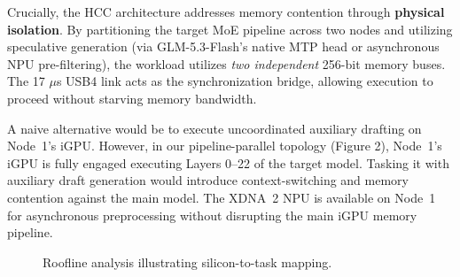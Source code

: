 \documentclass[11pt,a4paper]{article}
\begin{document}
\noindent Crucially, the HCC architecture addresses memory contention through \textbf{physical isolation}. By partitioning the target MoE pipeline across two nodes and utilizing speculative generation (via GLM-5.3-Flash's native MTP head or asynchronous NPU pre-filtering), the workload utilizes \textit{two independent} 256-bit memory buses. The 17 $\mu$s USB4 link acts as the synchronization bridge, allowing execution to proceed without starving memory bandwidth.

A naive alternative would be to execute uncoordinated auxiliary drafting on Node~1's iGPU. However, in our pipeline-parallel topology (Figure 2), Node~1's iGPU is fully engaged executing Layers 0--22 of the target model. Tasking it with auxiliary draft generation would introduce context-switching and memory contention against the main model. The XDNA~2 NPU is available on Node~1 for asynchronous preprocessing without disrupting the main iGPU memory pipeline.

\begin{figure}[ht!]
\centering
{}
\caption{Roofline analysis illustrating silicon-to-task mapping.}
\label{fig:roofline}
\end{figure}
\end{document}
